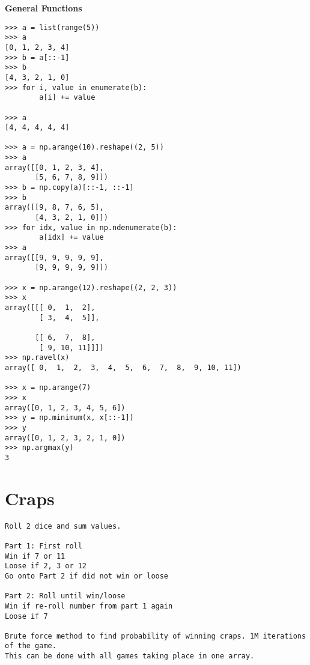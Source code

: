 \documentclass[oneside]{scrbook}
\begin{document}
\noindent
\textbf{General Functions}
\begin{verbatim}
>>> a = list(range(5))
>>> a
[0, 1, 2, 3, 4]
>>> b = a[::-1]
>>> b
[4, 3, 2, 1, 0]
>>> for i, value in enumerate(b):
	    a[i] += value

>>> a
[4, 4, 4, 4, 4]

>>> a = np.arange(10).reshape((2, 5))
>>> a
array([[0, 1, 2, 3, 4],
       [5, 6, 7, 8, 9]])
>>> b = np.copy(a)[::-1, ::-1]
>>> b
array([[9, 8, 7, 6, 5],
       [4, 3, 2, 1, 0]])
>>> for idx, value in np.ndenumerate(b):
	    a[idx] += value
>>> a
array([[9, 9, 9, 9, 9],
       [9, 9, 9, 9, 9]])

>>> x = np.arange(12).reshape((2, 2, 3))
>>> x
array([[[ 0,  1,  2],
        [ 3,  4,  5]],

       [[ 6,  7,  8],
        [ 9, 10, 11]]])
>>> np.ravel(x)
array([ 0,  1,  2,  3,  4,  5,  6,  7,  8,  9, 10, 11])

>>> x = np.arange(7)
>>> x
array([0, 1, 2, 3, 4, 5, 6])
>>> y = np.minimum(x, x[::-1])
>>> y
array([0, 1, 2, 3, 2, 1, 0])
>>> np.argmax(y)
3

\end{verbatim}

\bigskip
\section{Craps}
\begin{verbatim}
Roll 2 dice and sum values.

Part 1: First roll
Win if 7 or 11
Loose if 2, 3 or 12
Go onto Part 2 if did not win or loose

Part 2: Roll until win/loose
Win if re-roll number from part 1 again
Loose if 7

Brute force method to find probability of winning craps. 1M iterations of the game.
This can be done with all games taking place in one array.
\end{verbatim}




\iffalse
\bigskip

\section{Scipy}
doc link
book link

python3 -m pip install scipy skikit-image

Scipy
Universal functions
Generic Filters
generic filters for dialation//erosion
generic filters on multi color image

Convolutions

\section{Visualizations}

Matplotlib plots

sns distplot

Matplotlib show images

OpenCV show images
\fi
\end{document}
